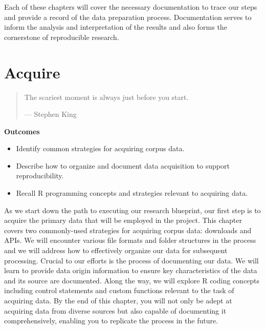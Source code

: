 \documentclass[
  letterpaper,
]{latex/krantz}
\providecommand{\tightlist}{%
  \setlength{\itemsep}{0pt}\setlength{\parskip}{0pt}}\usepackage{longtable,booktabs,array}
\theoremstyle{definition}
\theoremstyle{remark}
\begin{document}
Each of these chapters will cover the necessary documentation to trace
our steps and provide a record of the data preparation process.
Documentation serves to inform the analysis and interpretation of the
results and also forms the cornerstone of reproducible research.

\chapter{Acquire}\label{sec-acquire-chapter}

\begin{quote}
The scariest moment is always just before you start.

--- Stephen King
\end{quote}

\begin{tcolorbox}[enhanced jigsaw, breakable, leftrule=.75mm, arc=.35mm, colframe=quarto-callout-color-frame, colback=white, left=2mm, bottomrule=.15mm, rightrule=.15mm, toprule=.15mm, opacityback=0]

\textbf{ Outcomes}

\begin{itemize}
\tightlist
\item
  Identify common strategies for acquiring corpus data.
\item
  Describe how to organize and document data acquisition to support
  reproducibility.
\item
  Recall R programming concepts and strategies relevant to acquiring
  data.
\end{itemize}

\end{tcolorbox}

As we start down the path to executing our research blueprint, our first
step is to acquire the primary data that will be employed in the
project. This chapter covers two commonly-used strategies for acquiring
corpus data: downloads and APIs. We will encounter various file formats
and folder structures in the process and we will address how to
effectively organize our data for subsequent processing. Crucial to our
efforts is the process of documenting our data. We will learn to provide
data origin information to ensure key characteristics of the data and
its source are documented. Along the way, we will explore R coding
concepts including control statements and custom functions relevant to
the task of acquiring data. By the end of this chapter, you will not
only be adept at acquiring data from diverse sources but also capable of
documenting it comprehensively, enabling you to replicate the process in
the future.
\end{document}
